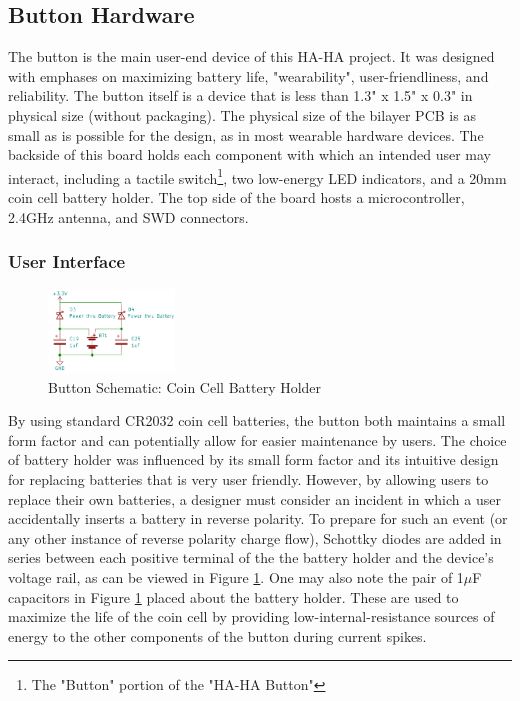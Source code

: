 \documentclass[journal,compsoc]{IEEEtran}
\begin{document}
\subsection{Button Hardware}

The button is the main user-end device of this HA-HA project. It was designed with emphases on maximizing battery life, "wearability", user-friendliness, and reliability.  The button itself is a device that is less than 1.3" x 1.5" x 0.3" in physical size (without packaging). The physical size of the bilayer PCB is as small as is possible for the design, as in most wearable hardware devices.  The backside of this board holds each component with which an intended user may interact, including a tactile switch\footnote{ The "Button" portion of the "HA-HA Button"}, two low-energy LED indicators, and a 20mm coin cell battery holder. The top side of the board hosts a microcontroller, 2.4GHz antenna, and SWD connectors.

\subsubsection{User Interface}

\begin{figure}[H]
\centering
\includegraphics[width=0.3\textwidth]{buttbat.PNG}
\caption{Button Schematic: Coin Cell Battery Holder}
\label{buttbatt}
\end{figure}

By using standard CR2032 coin cell batteries, the button both maintains a small form factor and can potentially allow for easier maintenance by users.  The choice of battery holder was influenced by its small form factor and its intuitive design for replacing batteries that is very user friendly. However, by allowing users to replace their own batteries, a designer must consider an incident in which a user accidentally inserts a battery in reverse polarity.  To prepare for such an event (or any other instance of reverse polarity charge flow), Schottky diodes are added in series between each positive terminal of the the battery holder and the device's voltage rail, as can be viewed in Figure \ref{buttbatt}. One may also note the pair of 1$\mu$F capacitors in Figure \ref{buttbatt} placed about the battery holder. These are used to maximize the life of the coin cell by providing low-internal-resistance sources of energy to the other components of the button during current spikes.
\end{document}
